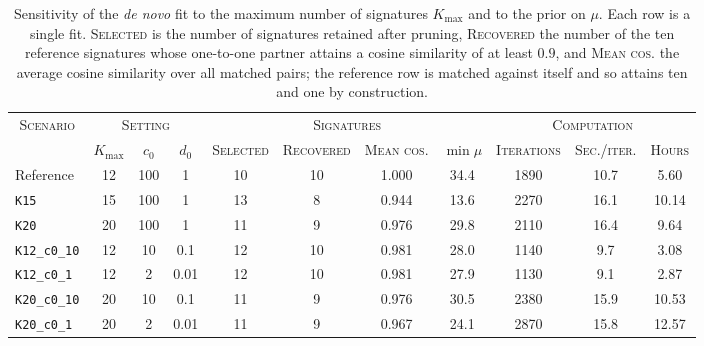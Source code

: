 \begin{table}[th]
\caption{Sensitivity of the \emph{de novo} fit to the maximum number of signatures $K_{\max}$ and to the prior on $\mu$. Each row is a single fit. \textsc{Selected} is the number of signatures retained after pruning, \textsc{Recovered} the number of the ten reference signatures whose one-to-one partner attains a cosine similarity of at least $0.9$, and \textsc{Mean cos.} the average cosine similarity over all matched pairs; the reference row is matched against itself and so attains ten and one by construction.}
\centering
\footnotesize
\begin{adjustbox}{max width=1\textwidth,center}
\begin{tabular}{|l|ccc|cccc|ccc|}
\hline
\multicolumn{1}{|c|}{\textsc{Scenario}} & \multicolumn{3}{c|}{\textsc{Setting}} & \multicolumn{4}{c|}{\textsc{Signatures}} & \multicolumn{3}{c|}{\textsc{Computation}} \\
& $K_{\max}$ & $c_0$ & $d_0$ & \textsc{Selected} & \textsc{Recovered} & \textsc{Mean cos.} & $\min\mu$ & \textsc{Iterations} & \textsc{Sec./iter.} & \textsc{Hours} \\
\hline
Reference & 12 & 100 & 1 & 10 & 10 & 1.000 & 34.4 & 1890 & 10.7 & 5.60 \\
\hline
\texttt{K15} & 15 & 100 & 1 & 13 & 8 & 0.944 & 13.6 & 2270 & 16.1 & 10.14 \\
\hline
\texttt{K20} & 20 & 100 & 1 & 11 & 9 & 0.976 & 29.8 & 2110 & 16.4 & 9.64 \\
\hline
\texttt{K12\_c0\_10} & 12 & 10 & 0.1 & 12 & 10 & 0.981 & 28.0 & 1140 & 9.7 & 3.08 \\
\hline
\texttt{K12\_c0\_1} & 12 & 2 & 0.01 & 12 & 10 & 0.981 & 27.9 & 1130 & 9.1 & 2.87 \\
\hline
\texttt{K20\_c0\_10} & 20 & 10 & 0.1 & 11 & 9 & 0.976 & 30.5 & 2380 & 15.9 & 10.53 \\
\hline
\texttt{K20\_c0\_1} & 20 & 2 & 0.01 & 11 & 9 & 0.967 & 24.1 & 2870 & 15.8 & 12.57 \\
\hline
\end{tabular}
\end{adjustbox}
\label{tab:sensitivity_denovo}
\end{table}
